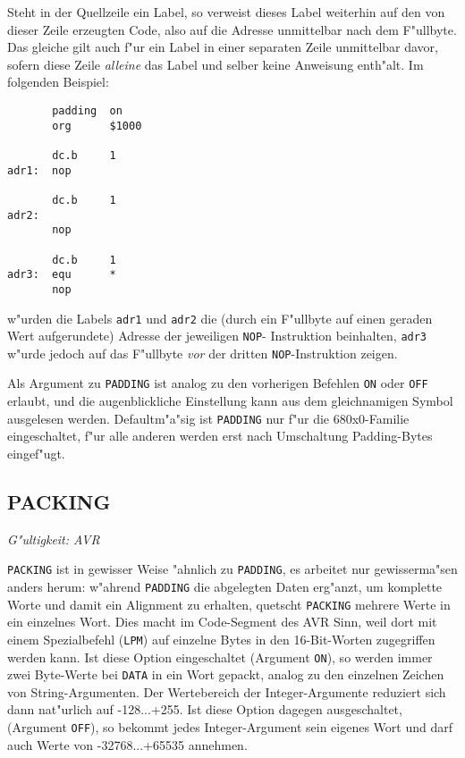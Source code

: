 \documentclass[12pt,a4paper,twoside]{report}
\makeatletter
\newcommand{\tty}[1]{{\tt #1}}
\newcommand{\ttindex}[1]{\index{#1@{\tt #1}}}
\makeatother
\begin{document}
Steht in der Quellzeile ein Label, so verweist dieses Label weiterhin
auf den von dieser Zeile erzeugten Code, also auf die Adresse unmittelbar
nach dem F"ullbyte.  Das gleiche gilt auch f"ur ein Label in einer
separaten Zeile unmittelbar davor, sofern diese Zeile {\em alleine} das
Label und selber keine Anweisung enth"alt.  Im folgenden Beispiel:
\begin{verbatim}
       padding  on
       org      $1000

       dc.b     1
adr1:  nop

       dc.b     1
adr2: 
       nop

       dc.b     1
adr3:  equ      *
       nop
\end{verbatim}
w"urden die Labels \tty{adr1} und \tty{adr2} die (durch ein F"ullbyte
auf einen geraden Wert aufgerundete) Adresse der jeweiligen \tty{NOP}-
Instruktion beinhalten, \tty{adr3} w"urde jedoch auf das F"ullbyte {\em vor}
der dritten \tty{NOP}-Instruktion zeigen.

Als Argument zu \tty{PADDING} ist analog zu den vorherigen Befehlen
\tty{ON} oder \tty{OFF} erlaubt, und die augenblickliche Einstellung
kann aus dem gleichnamigen Symbol ausgelesen werden. Defaultm"a"sig
ist \tty{PADDING} nur f"ur die 680x0-Familie eingeschaltet, f"ur alle
anderen werden erst nach Umschaltung Padding-Bytes eingef"ugt.


\subsection{PACKING}
\ttindex{PACKING}

{\em G"ultigkeit: AVR}

{\tt PACKING} ist in gewisser Weise "ahnlich zu {\tt PADDING}, es arbeitet
nur gewisserma"sen anders herum: w"ahrend {\tt PADDING} die
abgelegten Daten erg"anzt, um komplette Worte und damit ein Alignment zu
erhalten, quetscht {\tt PACKING} mehrere Werte in ein einzelnes Wort.
Dies macht im Code-Segment des AVR Sinn, weil dort mit einem Spezialbefehl
({\tt LPM}) auf einzelne Bytes in den 16-Bit-Worten zugegriffen werden
kann.  Ist diese Option eingeschaltet (Argument {\tt ON}), so werden immer
zwei Byte-Werte bei {\tt DATA} in ein Wort gepackt, analog zu den
einzelnen Zeichen von String-Argumenten.  Der Wertebereich der
Integer-Argumente reduziert sich dann nat"urlich auf -128...+255.  Ist
diese Option dagegen ausgeschaltet, (Argument {\tt OFF}), so bekommt
jedes Integer-Argument sein eigenes Wort und darf auch Werte von
-32768...+65535 annehmen.
\end{document}
